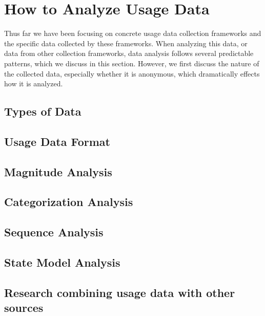 
\section{How to Analyze Usage Data}

Thus far we have been focusing on concrete usage data collection frameworks and the specific data collected by these frameworks. When analyzing this data, or data from other collection frameworks, data analysis follows several predictable patterns, which we discuss in this section. However, we first discuss the nature of the collected data, especially whether it is anonymous, which dramatically effects how it is analyzed.

\subsection{Types of Data}



\subsection{Usage Data Format}


\subsection{Magnitude Analysis}


\subsection{Categorization Analysis}


\subsection{Sequence Analysis}



\subsection{State Model Analysis}


\subsection{Research combining usage data with other sources}

